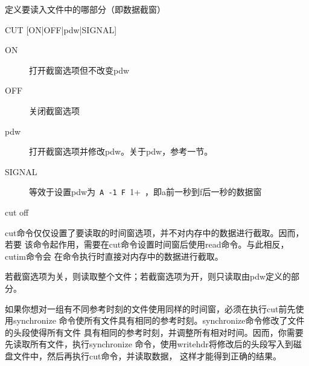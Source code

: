 \label{cmd:cut}

定义要读入文件中的哪部分（即数据截窗）

\begin{SACSTX}
CUT [ON|OFF|pdw|SIGNAL]
\end{SACSTX}

\begin{description}
\item [ON] 打开截窗选项但不改变pdw
\item [OFF] 关闭截窗选项
\item [pdw] 打开截窗选项并修改pdw。关于pdw，参考一节。
\item [SIGNAL] 等效于设置pdw为~\verb+A -1 F +1+~，即a前一秒到f后一秒的数据窗
\end{description}

\begin{SACDFT}
cut off
\end{SACDFT}

cut命令仅仅设置了要读取的时间窗选项，并不对内存中的数据进行截取。因而，若要
该命令起作用，需要在cut命令设置时间窗后使用read命令。与此相反，cutim命令会
在命令执行时直接对内存中的数据进行截取。

若截窗选项为关，则读取整个文件；若截窗选项为开，则只读取由pdw定义的部分。

如果你想对一组有不同参考时刻的文件使用同样的时间窗，必须在执行cut前先使用synchronize
命令使所有文件具有相同的参考时刻。synchronize命令修改了文件的头段使得所有文件
具有相同的参考时刻，并调整所有相对时间。因而，你需要先读取所有文件，执行synchronize
命令，使用writehdr将修改后的头段写入到磁盘文件中，然后再执行cut命令，并读取数据，
这样才能得到正确的结果。

